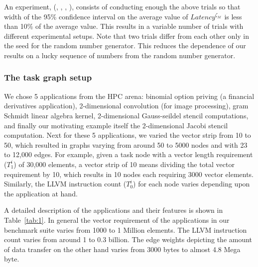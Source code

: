 An experiment, \expt(\numtplgynodes, \gpunum, \veclenset, \corenumset),
consists of conducting enough the above trials so that width of the 95\%
confidence interval on the average value of
$Latency^{\zeta_\mathcal{M}}$ is less than 10\% of the average
value. This results in a variable number of trials with different
experimental setups. Note that two trials differ from each other only in
the seed for the random number generator.  This reduces the dependence
of our results on a lucky sequence of numbers from the random number
generator.

\subsubsection{The task graph setup}
\label{sec:task-graph-setup}

We chose 5 applications from the HPC arena: binomial option priving (a
financial derivatives application), 2-dimensional convolution (for image
processing), gram Schmidt linear algebra kernel, 2-dimensional
Gauss-seildel stencil computations, and finally our motivating example
itself the 2-dimensional Jacobi stencil computation. Next for these 5
applications, we varied the vector strip from 10 to 50, which resulted
in graphs varying from around 50 to 5000 nodes and with 23 to 12,000
edges. For example, given a task node with a vector length requirement
($T^i_1$) of 30,000 elements, a vector strip of 10 means dividing the
total vector requirement by 10, which results in 10 nodes each requiring
3000 vector elements. Similarly, the LLVM instruction count ($T^i_0$)
for each node varies depending upon the application at hand.

A detailed description of the applications and their features is shown
in Table~\ref{tab:1}. In general the vector requirement of the
applications in our benchmark suite varies from 1000 to 1 Million
elements. The LLVM instruction count varies from around 1 to 0.3
billion. The edge weights depicting the amount of data transfer on the
other hand varies from 3000 bytes to almost 4.8 Mega byte.

